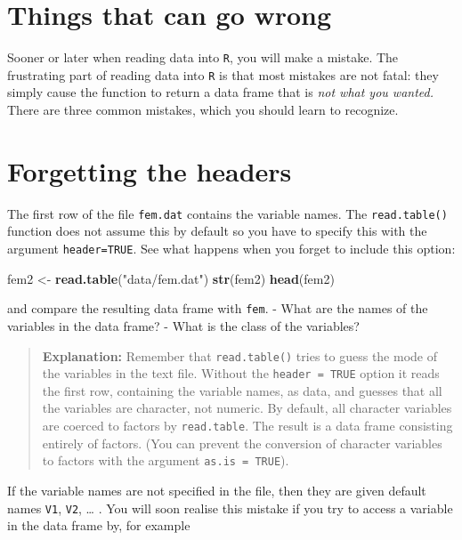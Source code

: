 \documentclass[
]{book}
\newenvironment{Shaded}{\begin{snugshade}}{\end{snugshade}}
\newcommand{\FunctionTok}[1]{\textcolor[rgb]{0.13,0.29,0.53}{\textbf{#1}}}
\newcommand{\NormalTok}[1]{#1}
\newcommand{\OtherTok}[1]{\textcolor[rgb]{0.56,0.35,0.01}{#1}}
\newcommand{\StringTok}[1]{\textcolor[rgb]{0.31,0.60,0.02}{#1}}
\begin{document}
\section{Things that can go wrong}\label{things-that-can-go-wrong}

Sooner or later when reading data into \texttt{R}, you will make a
mistake. The frustrating part of reading data into \texttt{R} is that
most mistakes are not fatal: they simply cause the function to return
a data frame that is \emph{not what you wanted.} There are three
common mistakes, which you should learn to recognize.

\section{Forgetting the headers}\label{forgetting-the-headers}

The first row of the file \texttt{fem.dat} contains the variable names.
The \texttt{read.table()} function does not assume this by default so
you have to specify this with the argument \texttt{header=TRUE}. See
what happens when you forget to include this option:

\begin{Shaded}
\begin{Highlighting}[]
\NormalTok{fem2 }\OtherTok{\textless{}{-}} \FunctionTok{read.table}\NormalTok{(}\StringTok{"data/fem.dat"}\NormalTok{)}
\FunctionTok{str}\NormalTok{(fem2)}
\FunctionTok{head}\NormalTok{(fem2)}
\end{Highlighting}
\end{Shaded}

and compare the resulting data frame with \texttt{fem}.
- What are the names of the variables in the data frame?
- What is the class of the variables?

\begin{quote}
\textbf{Explanation:} Remember that \texttt{read.table()} tries to guess
the mode of the variables in the text file. Without the
\texttt{header\ =\ TRUE} option it reads the first row, containing the
variable names, as data, and guesses that all the variables are
character, not numeric. By default, all character variables are
coerced to factors by \texttt{read.table}. The result is a data frame
consisting entirely of factors. (You can prevent the conversion of
character variables to factors with the argument \texttt{as.is\ =\ TRUE}).
\end{quote}

If the variable names are not specified in the file, then they are
given default names \texttt{V1}, \texttt{V2}, \ldots{} . You will soon realise this
mistake if you try to access a variable in the data frame by, for
example
\end{document}
